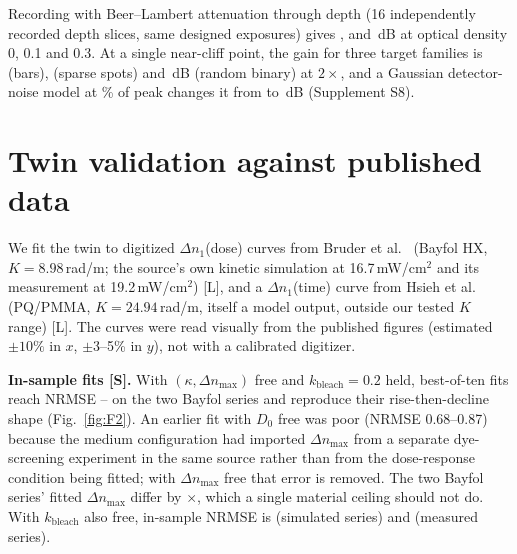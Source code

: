 \documentclass{optica-article}
\begin{document}
Recording with Beer--Lambert attenuation through depth (16 independently
recorded depth slices, same designed exposures) gives \SSevenGainODZero,
\SSevenGainODOneTenth{} and \SSevenGainODThreeTenths\,dB at optical density
0, 0.1 and 0.3. At a single near-cliff point, the gain for three target
families is \SFourGainBarsTwoX{} (bars), \SFourGainSpotsTwoX{} (sparse
spots) and \SFourGainRandomBinaryTwoX\,dB (random binary) at $2\times$, and
a Gaussian detector-noise model at \SFiveNoiseStdPct\% of peak changes it
from \SFiveNoiselessGain{} to \SFiveNoisyGain\,dB (Supplement S8).

\section{Twin validation against published data}
\label{sec:twin-validation-ref}
We fit the twin to digitized $\Delta n_1$(dose) curves from Bruder et
al.~\cite{bruder2017bayfol} (Bayfol HX, $K=8.98$\,rad/\textmu m; the
source's own kinetic simulation at 16.7\,mW/cm$^2$ and its measurement at
19.2\,mW/cm$^2$) [L], and a $\Delta n_1$(time) curve from Hsieh et
al.~\cite{hsieh2022pqpmma} (PQ/PMMA, $K=24.94$\,rad/\textmu m, itself a
model output, outside our tested $K$ range) [L]. The curves were read
visually from the published figures (estimated $\pm10\%$ in $x$, $\pm3$--5\%
in $y$), not with a calibrated digitizer.

\textbf{In-sample fits [S].} With $(\kappa,\Delta n_{\max})$ free and
$k_{\text{bleach}}=0.2$ held, best-of-ten fits reach NRMSE
\NRMSEBestInRegime--\NRMSEWorstInRegime{} on the two Bayfol series and
reproduce their rise-then-decline shape (Fig.~\ref{fig:F2}). An earlier fit
with $D_0$ free was poor (NRMSE 0.68--0.87) because the medium configuration
had imported $\Delta n_{\max}$ from a separate dye-screening experiment in
the same source rather than from the dose-response condition being fitted;
with $\Delta n_{\max}$ free that error is removed. The two Bayfol series'
fitted $\Delta n_{\max}$ differ by \BayfolDnMaxRatio$\times$, which a single
material ceiling should not do. With $k_{\text{bleach}}$ also free, in-sample
NRMSE is \HoldoutBSimIn{} (simulated series) and \HoldoutBExpIn{}
(measured series).
\end{document}

